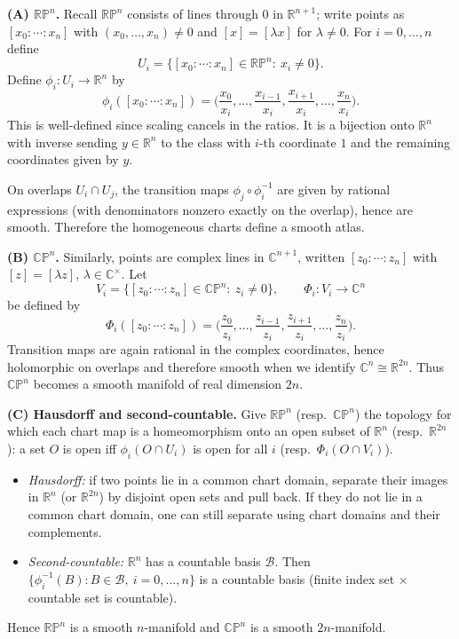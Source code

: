 \begin{solution}
\smallskip
\noindent\textbf{(A) $\mathbb{RP}^n$.}
Recall $\mathbb{RP}^n$ consists of lines through $0$ in $\mathbb R^{n+1}$; write points as
$[x_0:\cdots:x_n]$ with $(x_0,\dots,x_n)\neq 0$ and $[x]=[\lambda x]$ for $\lambda\neq 0$.
For $i=0,\dots,n$ define
\[
U_i=\{[x_0:\cdots:x_n]\in\mathbb{RP}^n:\ x_i\neq 0\}.
\]
Define $\phi_i:U_i\to\mathbb R^n$ by
\[
\phi_i([x_0:\cdots:x_n])
=
\Big(\frac{x_0}{x_i},\dots,\frac{x_{i-1}}{x_i},\frac{x_{i+1}}{x_i},\dots,\frac{x_n}{x_i}\Big).
\]
This is well-defined since scaling cancels in the ratios. It is a bijection onto $\mathbb R^n$ with inverse
sending $y\in\mathbb R^n$ to the class with $i$-th coordinate $1$ and the remaining coordinates given by $y$.

On overlaps $U_i\cap U_j$, the transition maps $\phi_j\circ\phi_i^{-1}$ are given by rational expressions
(with denominators nonzero exactly on the overlap), hence are smooth. Therefore the homogeneous charts define a smooth atlas.

\smallskip
\noindent\textbf{(B) $\mathbb{CP}^n$.}
Similarly, points are complex lines in $\mathbb C^{n+1}$, written $[z_0:\cdots:z_n]$ with $[z]=[\lambda z]$, $\lambda\in\mathbb C^\times$.
Let
\[
V_i=\{[z_0:\cdots:z_n]\in\mathbb{CP}^n:\ z_i\neq 0\},
\qquad
\Phi_i:V_i\to\mathbb C^n
\]
be defined by
\[
\Phi_i([z_0:\cdots:z_n])
=
\Big(\frac{z_0}{z_i},\dots,\frac{z_{i-1}}{z_i},\frac{z_{i+1}}{z_i},\dots,\frac{z_n}{z_i}\Big).
\]
Transition maps are again rational in the complex coordinates, hence holomorphic on overlaps and therefore smooth
when we identify $\mathbb C^n\cong\mathbb R^{2n}$. Thus $\mathbb{CP}^n$ becomes a smooth manifold of real dimension $2n$.

\smallskip
\noindent\textbf{(C) Hausdorff and second-countable.}
Give $\mathbb{RP}^n$ (resp.\ $\mathbb{CP}^n$) the topology for which each chart map is a homeomorphism onto an open subset of $\mathbb R^n$
(resp.\ $\mathbb R^{2n}$): a set $O$ is open iff $\phi_i(O\cap U_i)$ is open for all $i$ (resp.\ $\Phi_i(O\cap V_i)$).

\begin{itemize}
	\item \emph{Hausdorff:} if two points lie in a common chart domain, separate their images in $\mathbb R^n$ (or $\mathbb R^{2n}$) by disjoint open sets
	and pull back. If they do not lie in a common chart domain, one can still separate using chart domains and their complements.
	\item \emph{Second-countable:} $\mathbb R^n$ has a countable basis $\mathcal B$. Then
	$\{\phi_i^{-1}(B): B\in\mathcal B,\ i=0,\dots,n\}$ is a countable basis (finite index set $\times$ countable set is countable).
\end{itemize}
Hence $\mathbb{RP}^n$ is a smooth $n$-manifold and $\mathbb{CP}^n$ is a smooth $2n$-manifold.


\end{solution}
